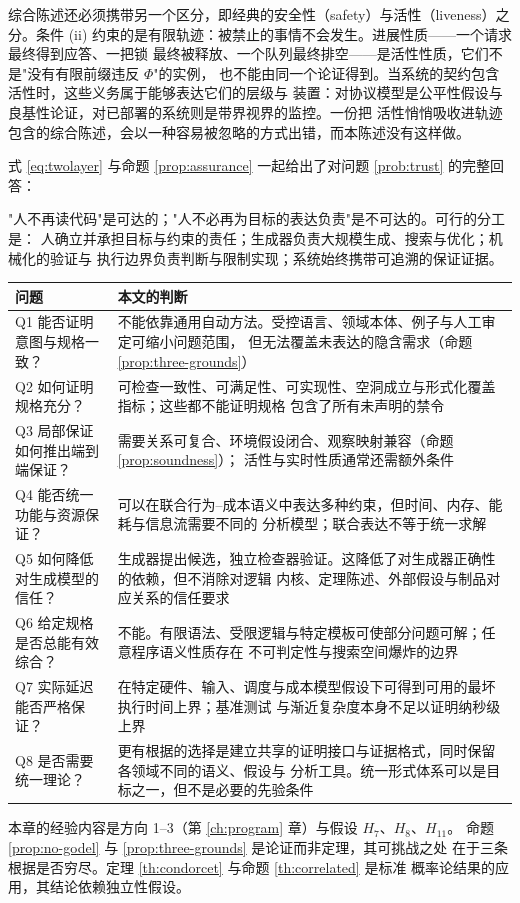 综合陈述还必须携带另一个区分，即经典的安全性（safety）与活性（liveness）之分。条件
(ii) 约束的是有限轨迹：被禁止的事情不会发生。进展性质——一个请求最终得到应答、一把锁
最终被释放、一个队列最终排空——是活性性质，它们不是"没有有限前缀违反 $\Phi$"的实例，
也不能由同一个论证得到。当系统的契约包含活性时，这些义务属于能够表达它们的层级与
装置：对协议模型是公平性假设与良基性论证，对已部署的系统则是带界视界的监控。一份把
活性悄悄吸收进轨迹包含的综合陈述，会以一种容易被忽略的方式出错，而本陈述没有这样做。

式 \eqref{eq:twolayer} 与命题 \ref{prop:assurance} 一起给出了对问题 \ref{prob:trust}
的完整回答：

\begin{principle}\label{pr:answer}
"人不再读代码"是可达的；"人不必再为目标的表达负责"是不可达的。可行的分工是：
人确立并承担目标与约束的责任；生成器负责大规模生成、搜索与优化；机械化的验证与
执行边界负责判断与限制实现；系统始终携带可追溯的保证证据。
\end{principle}

\begin{remark}\label{rmk:q1q8}
\begin{longtable}{L{5.4cm}L{9.0cm}}
\toprule
\textbf{问题} & \textbf{本文的判断} \\
\midrule
\endhead
Q1 能否证明意图与规格一致？ &
  不能依靠通用自动方法。受控语言、领域本体、例子与人工审定可缩小问题范围，
  但无法覆盖未表达的隐含需求（命题 \ref{prop:three-grounds}）\\
Q2 如何证明规格充分？ &
  可检查一致性、可满足性、可实现性、空洞成立与形式化覆盖指标；这些都不能证明规格
  包含了所有未声明的禁令 \\
Q3 局部保证如何推出端到端保证？ &
  需要关系可复合、环境假设闭合、观察映射兼容（命题 \ref{prop:soundness}）；
  活性与实时性质通常还需额外条件 \\
Q4 能否统一功能与资源保证？ &
  可以在联合行为--成本语义中表达多种约束，但时间、内存、能耗与信息流需要不同的
  分析模型；联合表达不等于统一求解 \\
Q5 如何降低对生成模型的信任？ &
  生成器提出候选，独立检查器验证。这降低了对生成器正确性的依赖，但不消除对逻辑
  内核、定理陈述、外部假设与制品对应关系的信任要求 \\
Q6 给定规格是否总能有效综合？ &
  不能。有限语法、受限逻辑与特定模板可使部分问题可解；任意程序语义性质存在
  不可判定性与搜索空间爆炸的边界 \\
Q7 实际延迟能否严格保证？ &
  在特定硬件、输入、调度与成本模型假设下可得到可用的最坏执行时间上界；基准测试
  与渐近复杂度本身不足以证明纳秒级上界 \\
Q8 是否需要统一理论？ &
  更有根据的选择是建立共享的证明接口与证据格式，同时保留各领域不同的语义、假设与
  分析工具。统一形式体系可以是目标之一，但不是必要的先验条件 \\
\bottomrule
\end{longtable}
\end{remark}

本章的经验内容是方向 1--3（第 \ref{ch:program} 章）与假设 $H_7$、$H_8$、$H_{11}$。
命题 \ref{prop:no-godel} 与 \ref{prop:three-grounds} 是论证而非定理，其可挑战之处
在于三条根据是否穷尽。定理 \ref{th:condorcet} 与命题 \ref{th:correlated} 是标准
概率论结果的应用，其结论依赖独立性假设。
